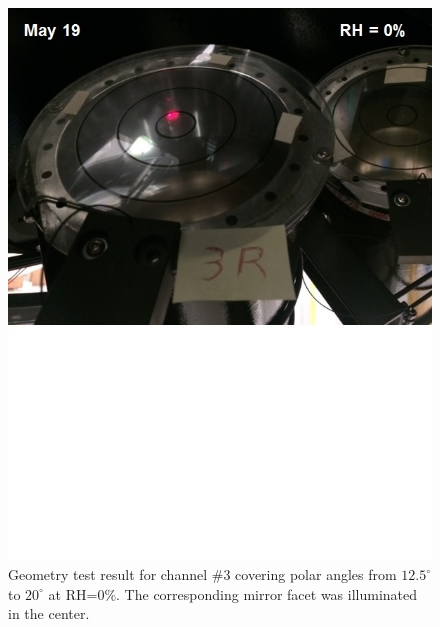 \begin{figure}[ht]
    \centering
    \includegraphics[width=1.0\linewidth,trim={0 8.5cm 0 0},clip]{images/GEO_TEST_3_Zero.jpg}
    \caption{Geometry test result for channel \#3 covering polar angles from $12.5^\circ$ to $20^\circ$
      at RH=0\%. The corresponding mirror facet was illuminated in the center.}
    \label{fig:GEO_TEST_3_Zero}
\end{figure}
        
